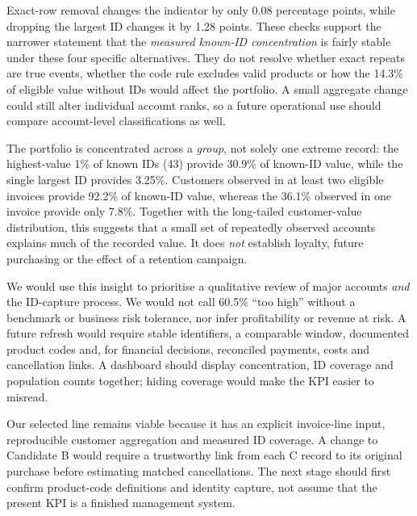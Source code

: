 \documentclass[10pt,a4paper]{article}
\newcommand{\sectionhead}[1]{\Needspace{8\baselineskip}\vspace{0.33em}{\large\bfseries\color{navy}#1}\par\vspace{0.08em}}
\newcommand{\subhead}[1]{\vspace{0.15em}{\bfseries #1}\par}
\begin{document}
Exact-row removal changes the indicator by only 0.08 percentage points, while dropping the largest ID changes it by 1.28 points. These checks support the narrower statement that the \emph{measured known-ID concentration} is fairly stable under these four specific alternatives. They do not resolve whether exact repeats are true events, whether the code rule excludes valid products or how the 14.3\% of eligible value without IDs would affect the portfolio. A small aggregate change could still alter individual account ranks, so a future operational use should compare account-level classifications as well.

\subhead{Main EDA insight and decision}
The portfolio is concentrated across a \emph{group}, not solely one extreme record: the highest-value 1\% of known IDs (43) provide 30.9\% of known-ID value, while the single largest ID provides 3.25\%. Customers observed in at least two eligible invoices provide 92.2\% of known-ID value, whereas the 36.1\% observed in one invoice provide only 7.8\%. Together with the long-tailed customer-value distribution, this suggests that a small set of repeatedly observed accounts explains much of the recorded value. It does \emph{not} establish loyalty, future purchasing or the effect of a retention campaign.

We would use this insight to prioritise a qualitative review of major accounts \emph{and} the ID-capture process. We would not call 60.5\% ``too high'' without a benchmark or business risk tolerance, nor infer profitability or revenue at risk. A future refresh would require stable identifiers, a comparable window, documented product codes and, for financial decisions, reconciled payments, costs and cancellation links. A dashboard should display concentration, ID coverage and population counts together; hiding coverage would make the KPI easier to misread.

\sectionhead{8\quad Continuation beyond C1}
Our selected line remains viable because it has an explicit invoice-line input, reproducible customer aggregation and measured ID coverage. A change to Candidate B would require a trustworthy link from each C record to its original purchase before estimating matched cancellations. The next stage should first confirm product-code definitions and identity capture, not assume that the present KPI is a finished management system.
\end{document}
